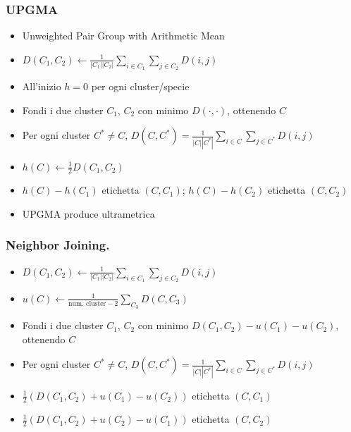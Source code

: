 \begin{frame}[fragile]
	\frametitle{UPGMA}
	\begin{itemize}
		\item
		      Unweighted Pair Group with Arithmetic Mean
		\item
		      $D(C_{1}, C_{2}) \gets \frac{1}{|C_{1}||C_{2}|}\sum_{i\in C_{1}}\sum_{j\in C_{2}} D(i,j)$
		\item
		      All'inizio $h=0$ per ogni cluster/specie
		\item
		      Fondi i due cluster $C_{1}$, $C_{2}$ con minimo $D(\cdot, \cdot)$, ottenendo $C$
		\item
		      Per ogni cluster $C^{*}\neq C$, $D(C, C^{*}) = \frac{1}{|C||C^{*}|}\sum_{i\in C}\sum_{j\in C^{*}} D(i,j)$
		\item
		      $h(C)\gets \frac{1}{2}D(C_{1}, C_{2})$
		\item
		      $h(C) - h(C_{1})$ etichetta $(C, C_{1})$; $h(C) - h(C_{2})$ etichetta $(C, C_{2})$
		\item
		      UPGMA produce ultrametrica
	\end{itemize}
\end{frame}

\begin{frame}[fragile]
	\frametitle{Neighbor Joining.}
	\begin{itemize}
		\item
		      $D(C_{1}, C_{2}) \gets \frac{1}{|C_{1}||C_{2}|}\sum_{i\in C_{1}}\sum_{j\in C_{2}} D(i,j)$
		\item
		      $u(C) \gets \frac{1}{\text{num. cluster} - 2} \sum_{C_{3}} D(C,C_{3})$
		\item
		      Fondi i due cluster $C_{1}$, $C_{2}$ con minimo $D(C_{1}, C_{2}) - u(C_{1}) -u(C_{2})$, ottenendo $C$
		\item
		      Per ogni cluster $C^{*}\neq C$, $D(C, C^{*}) = \frac{1}{|C||C^{*}|}\sum_{i\in C}\sum_{j\in C^{*}} D(i,j)$
		\item
		      $\frac{1}{2}\left(D(C_{1}, C_{2}) + u(C_{1}) - u(C_{2})\right)$ etichetta $(C, C_{1})$
		\item
		      $\frac{1}{2}\left(D(C_{1}, C_{2}) + u(C_{2}) - u(C_{1})\right)$ etichetta $(C, C_{2})$
	\end{itemize}
\end{frame}

